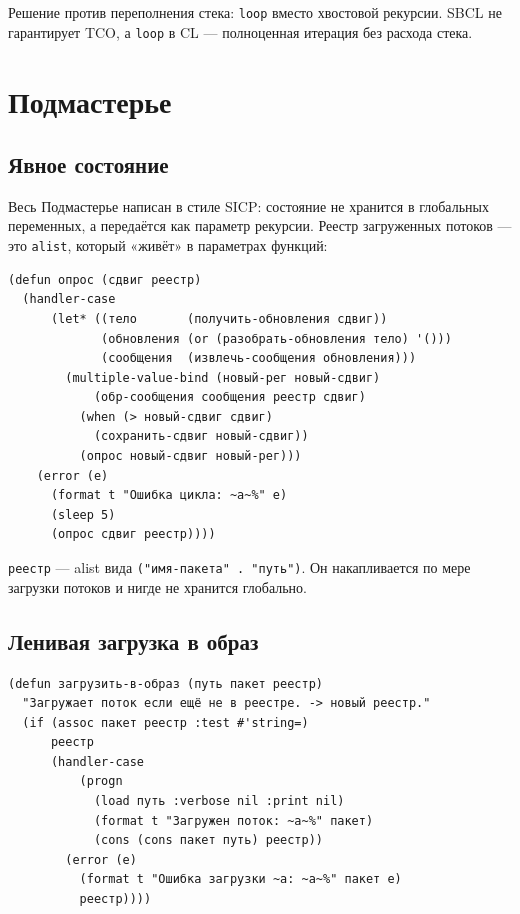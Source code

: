 \documentclass[11pt,a4paper]{article}
\begin{document}
Решение против переполнения стека: \texttt{loop} вместо хвостовой рекурсии. SBCL не гарантирует TCO, а \texttt{loop} в CL — полноценная итерация без расхода стека.

\section{Подмастерье}

\subsection{Явное состояние}

Весь Подмастерье написан в стиле SICP: состояние не хранится в глобальных переменных, а передаётся как параметр рекурсии. Реестр загруженных потоков — это \texttt{alist}, который «живёт» в параметрах функций:

\begin{lstlisting}[caption={подмастерье/main.lisp — рекурсивный цикл с явным состоянием}]
(defun опрос (сдвиг реестр)
  (handler-case
      (let* ((тело       (получить-обновления сдвиг))
             (обновления (or (разобрать-обновления тело) '()))
             (сообщения  (извлечь-сообщения обновления)))
        (multiple-value-bind (новый-рег новый-сдвиг)
            (обр-сообщения сообщения реестр сдвиг)
          (when (> новый-сдвиг сдвиг)
            (сохранить-сдвиг новый-сдвиг))
          (опрос новый-сдвиг новый-рег)))
    (error (e)
      (format t "Ошибка цикла: ~a~%" e)
      (sleep 5)
      (опрос сдвиг реестр))))
\end{lstlisting}

\texttt{реестр} — alist вида \texttt{("имя-пакета" . "путь")}. Он накапливается по мере загрузки потоков и нигде не хранится глобально.

\subsection{Ленивая загрузка в образ}

\begin{lstlisting}[caption={подмастерье/main.lisp — идемпотентная загрузка}]
(defun загрузить-в-образ (путь пакет реестр)
  "Загружает поток если ещё не в реестре. -> новый реестр."
  (if (assoc пакет реестр :test #'string=)
      реестр
      (handler-case
          (progn
            (load путь :verbose nil :print nil)
            (format t "Загружен поток: ~a~%" пакет)
            (cons (cons пакет путь) реестр))
        (error (e)
          (format t "Ошибка загрузки ~a: ~a~%" пакет e)
          реестр))))
\end{lstlisting}
\end{document}
